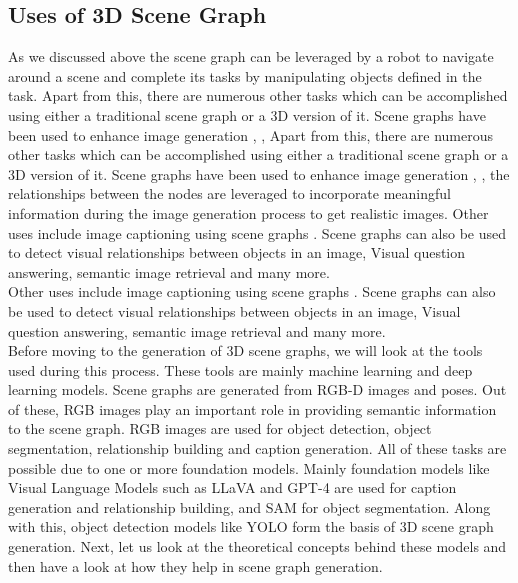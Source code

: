\subsection{Uses of 3D Scene Graph}
As we discussed above the scene graph can be leveraged by a robot to navigate around a scene and complete its tasks by manipulating objects defined in the task. 
Apart from this, there are numerous other tasks which can be accomplished using either a traditional scene graph or a 3D version of it. Scene graphs have been 
used to enhance image generation \cite{tripathi2019usingscenegraphcontext}, \cite{johnson2018imagegenerationscenegraphs}, 
Apart from this, there are numerous other tasks which can be accomplished using either a traditional scene graph or a 3D version of it. Scene graphs have been 
used to enhance image generation \cite{tripathi2019usingscenegraphcontext}, \cite{johnson2018imagegenerationscenegraphs}, 
the relationships between the nodes are leveraged to incorporate meaningful information during the image generation process to get realistic images.
 Other uses include image captioning using scene graphs \cite{8953305}. 
 Scene graphs can also be used to detect visual relationships between objects in an image, Visual question answering, semantic image retrieval and many more. \\
 Other uses include image captioning using scene graphs \cite{8953305}. 
 Scene graphs can also be used to detect visual relationships between objects in an image, Visual question answering, semantic image retrieval and many more. \\
Before moving to the generation of 3D scene graphs, we will look at the tools used during this process. 
These tools are mainly machine learning and deep learning models. Scene graphs are generated from RGB-D images and poses. 
Out of these, RGB images play an important role in providing semantic information to the scene graph. RGB images are used for object detection,
object segmentation, relationship building and caption generation. All of these tasks are possible due to one or more foundation models.
Mainly foundation models like Visual Language Models such as LLaVA \cite{liu2023visualinstructiontuning} and GPT-4 \cite{openai2024gpt4technicalreport} are used for caption generation and 
relationship building, and SAM \cite{kirillov2023segment} for object segmentation. Along with this, object detection models like YOLO \cite{cheng2024yolow} form the basis of 
3D scene graph generation. 
Next, let us look at the theoretical concepts behind these models and then have a look at how they help in scene graph generation.
